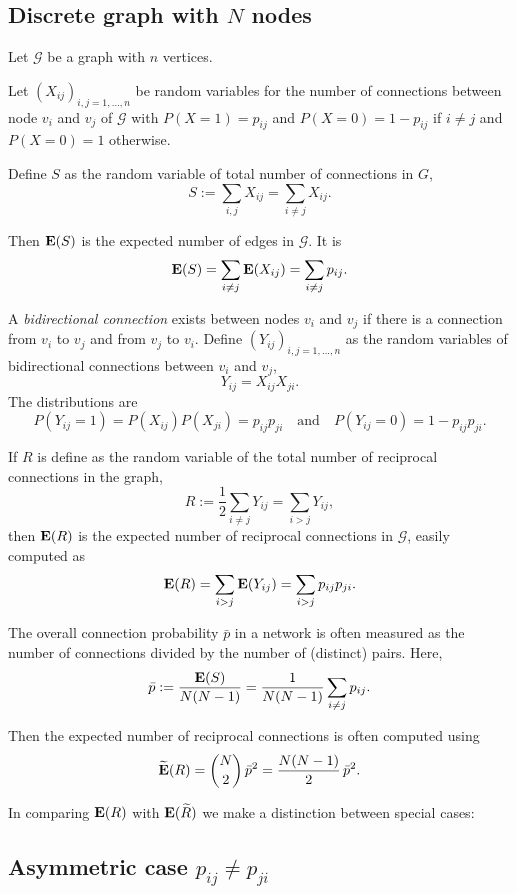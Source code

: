 \subsection{Discrete graph with $N$ nodes}

Let $\mathcal{G}$ be a graph with $n$ vertices.

Let $(X_{ij})_{i,j=1,...,n}$ be random variables for the number of connections between node $v_i$ and $v_j$ of $\mathcal{G}$ with $P(X=1)=p_{ij}$ and $P(X=0)=1-p_{ij}$ if $i \neq j$ and $P(X=0) =1 $ otherwise.

Define $S$ as the random variable of total number of connections in $G$,
\[
S := \sum_{i,j} X_{ij} = \sum_{i \neq j} X_{ij}.
\]

Then $\operatorname{\mathbf{E}}(S)$ is the expected number of edges in $\mathcal{G}$. It is
\[
\operatorname{\mathbf{E}}(S) = \sum_{i \neq j} \operatorname{\mathbf{E}}(X_{ij}) = \sum_{i \neq j} p_{ij}.
\]

A \emph{bidirectional connection} exists between nodes $v_i$ and $v_j$ if there is a connection from $v_i$ to $v_j$ and from $v_j$ to $v_i$. Define  $(Y_{ij})_{i,j=1,...,n}$ as the random variables of bidirectional connections between $v_i$ and $v_j$,
\[
Y_{ij} = X_{ij} X_{ji}.
\]
The distributions are
\[
P(Y_{ij} = 1) = P(X_{ij}) P(X_{ji}) = p_{ij} p_{ji} \quad \mathrm{and} \quad P(Y_{ij} = 0) = 1 - p_{ij}p_{ji}.
\]

If $R$ is define as the random variable of the total number of reciprocal connections in the graph,
\[
R := \frac{1}{2} \sum_{i \neq j} Y_{ij} = \sum_{i > j} Y_{ij},
\]
then $\operatorname{\mathbf{E}}(R)$ is the expected number of reciprocal connections in $\mathcal{G}$, easily computed as
\[
\operatorname{\mathbf{E}}(R) = \sum_{i>j} \operatorname{\mathbf{E}}(Y_{ij}) = \sum_{i > j} p_{ij} p_{ji}.
\]

The overall connection probability $\bar{p}$ in a network is often measured as the number of connections divided by the number of (distinct) pairs. Here,
\[
\bar{p} := \frac{\operatorname{\mathbf{E}}(S)}{N(N-1)} = \frac{1}{N(N-1)} \sum_{i \neq j} p_{ij}.
\]

Then the expected number of reciprocal connections is often computed using
\[
\widetilde{\operatorname{\mathbf{E}}}(R) = \binom{N}{2}\, \bar{p}^2 = \frac{N(N-1)}{2}\,  \bar{p}^2.
\]

In comparing $\operatorname{\mathbf{E}}(R)$ with $\operatorname{\mathbf{E}}(\widetilde{R})$ we make a distinction between special cases:

\subsection{Asymmetric case $p_{ij} \neq  p _{ji}$}

